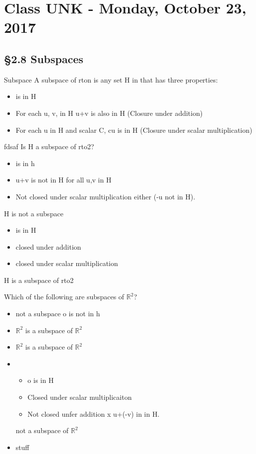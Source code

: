\chapter{Class UNK - Monday, October 23, 2017}
\section{\S 2.8 Subspaces}

\begin{imp:defn}{Subspace}{} A subspace of rton is any set H in  that has three properties:
\begin{itemize}
  \item  is in H
  \item For each u, v, in H u+v is also in H (Closure under addition)
  \item For each u in H and scalar C, cu is in H (Closure under scalar multiplication)
\end{itemize}
\end{imp:defn}
\begin{ex}
fdsaf
Is H a subspace of rto2?
\begin{itemize}
\item is in h \checkmark
\item u+v is not in H for all u,v in H
\item Not closed under scalar multiplication either (-u not in H).
\end{itemize}
H is not a subspace
\end{ex}
\begin{ex}
\begin{itemize}
    \item is in H \checkmark
    \item closed under addition \checkmark
    \item closed under scalar multiplication \checkmark
\end{itemize}
H is a subspace of rto2
\end{ex}
\begin{ex}
Which of the following are subspaces of $\mathbb{R}^{2}$?

\begin{itemize}
    \item %
    not a subspace o is not in h
    \item %
    $\mathbb{R}^2$ is a subspace of $\mathbb{R}^2$
    \item %
    $\mathbb{R}^2$ is a subspace of $\mathbb{R}^2$
    \item %
    \begin{itemize}
        \item o is in H \checkmark
        \item Closed under scalar multiplicaiton \checkmark
        \item Not closed unfer addition x u+(-v) in in H.
    \end{itemize}
    not a subspace of $\mathbb{R}^2$
    \item %
    stuff
\end{itemize}
\end{ex}

